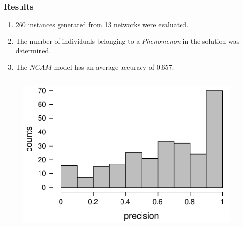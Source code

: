 \documentclass[aspectratio=169]{beamer}
\begin{document}
\begin{frame}
\frametitle{Results}
  \begin{enumerate}
    \item 260 instances generated from 13 networks were evaluated.
    \item The number of individuals belonging to a \textit{Phenomenon} in the solution was determined. 
    \item The $NCAM$ model has an average accuracy of 0.657.
  \end{enumerate}
  \vfill
  \begin{columns}
  
  \begin{figure}[ht]
    \centering
    \includegraphics[width=\textwidth]{images/histogram-ncam.pdf}
  \end{figure}
\end{columns}
\end{frame}
\end{document}

